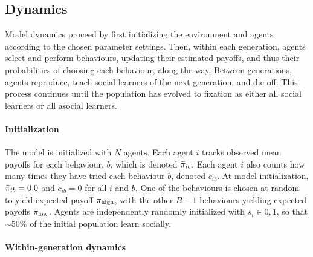 \documentclass[letterpaper,11.5pt]{scrartcl}
\begin{document}
\subsection{Dynamics}

Model dynamics proceed by first initializing the environment and agents according
to the chosen parameter settings. %
Then, within each generation, agents select and perform behaviours, updating their estimated payoffs, and thus their probabilities of choosing each behaviour, along the way.
Between generations, agents reproduce, teach social learners of the next generation, and die off. 
This process continues until the population has evolved to fixation as either all social learners or
all asocial learners. %


\paragraph{Initialization}

The model is initialized with $N$ agents. Each agent $i$ tracks 
observed mean payoffs for each behaviour, $b$, which is denoted $\bar\pi_{ib}$. Each
agent $i$ also counts how many times they have tried each behaviour $b$, 
denoted $c_{ib}$. At model initialization, $\bar\pi_{ib} = 0.0$ and $c_{ib} = 0$ for
all $i$ and $b$.%
One of the behaviours is chosen at random to yield expected payoff $\pi_{\mathrm{high}}$, with the other $B-1$ behaviours yielding
expected payoffs $\pi_{\mathrm{low}}$. Agents are independently randomly initialized with $s_i
\in 0,1$, so that $\sim$50\% of the initial population learn socially.


\paragraph{Within-generation dynamics}
\end{document}
